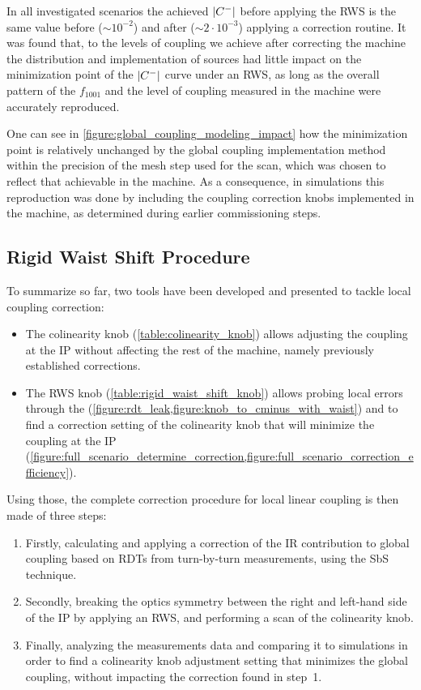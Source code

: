 In all investigated scenarios the achieved \(\left\lvert C^{-} \right\rvert\) before applying the RWS is the same value before (\(\sim 10^{-2}\)) and after (\(\sim 2 \cdot 10^{-3}\)) applying a correction routine.
It was found that, to the levels of coupling we achieve after correcting the machine the distribution and implementation of sources had little impact on the minimization point of the \(\left\lvert C^{-} \right\rvert\) curve under an RWS, as long as the overall pattern of the \(f_{1001}\) and the level of coupling measured in the machine were accurately reproduced.

One can see in \cref{figure:global_coupling_modeling_impact} how the minimization point is relatively unchanged by the global coupling implementation method within the precision of the mesh step used for the scan, which was chosen to reflect that achievable in the machine.
As a consequence, in simulations this reproduction was done by including the coupling correction knobs implemented in the machine, as determined during earlier commissioning steps.

\subsection{Rigid Waist Shift Procedure}

To summarize so far, two tools have been developed and presented to tackle local coupling correction:
\begin{itemize}
    \item The colinearity knob (\cref{table:colinearity_knob}) allows adjusting the coupling at the \gls{IP} without affecting the rest of the machine, namely previously established corrections.
    \item The \acrlong{RWS} knob (\cref{table:rigid_waist_shift_knob}) allows probing local errors through the  (\cref{figure:rdt_leak,figure:knob_to_cminus_with_waist}) and to find a correction setting of the colinearity knob that will minimize the coupling at the \gls{IP} (\cref{figure:full_scenario_determine_correction,figure:full_scenario_correction_efficiency}).
\end{itemize}

Using those, the complete correction procedure for local linear coupling is then made of three steps:
\begin{enumerate}
    \item Firstly, calculating and applying a correction of the IR contribution to global coupling based on RDTs from turn-by-turn measurements, using the SbS technique.
    \item Secondly, breaking the optics symmetry between the right and left-hand side of the IP by applying an RWS, and performing a scan of the colinearity knob.
    \item Finally, analyzing the measurements data and comparing it to simulations in order to find a colinearity knob adjustment setting that minimizes the global coupling, without impacting the correction found in step~\num{1}.
\end{enumerate}

